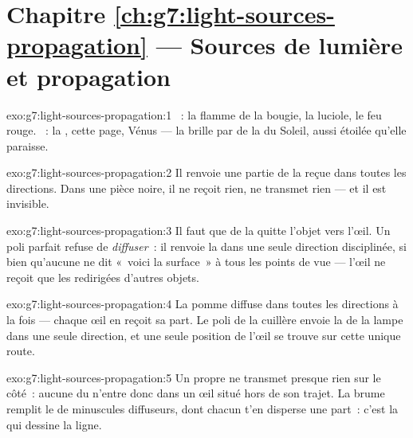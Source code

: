 \section*{Chapitre \ref{ch:g7:light-sources-propagation} --- Sources de lumière et propagation}

\begin{solution}{exo:g7:light-sources-propagation:1}
~: la flamme de la bougie, la luciole, le feu rouge.
~: la , cette page, Vénus --- la  brille
par  de la  du Soleil, aussi étoilée qu'elle
paraisse.
\end{solution}

\begin{solution}{exo:g7:light-sources-propagation:2}
Il renvoie une partie de la  reçue dans toutes les directions.
Dans une pièce noire, il ne reçoit rien, ne transmet rien --- et il
est invisible.
\end{solution}

\begin{solution}{exo:g7:light-sources-propagation:3}
Il faut que de la  quitte l'objet vers l'œil. Un poli parfait
refuse de \emph{diffuser}~: il renvoie la  dans une seule
direction disciplinée, si bien qu'aucune  ne dit «~voici la
surface~» à tous les points de vue --- l'œil ne reçoit que les 
redirigées d'autres objets.
\end{solution}

\begin{solution}{exo:g7:light-sources-propagation:4}
La pomme diffuse dans toutes les directions à la fois --- chaque œil
en reçoit sa part. Le poli de la cuillère envoie la  de la
lampe dans une seule direction, et une seule position de l'œil se
trouve sur cette unique route.
\end{solution}

\begin{solution}{exo:g7:light-sources-propagation:5}
Un  propre ne transmet presque rien sur le côté~: aucune 
du  n'entre donc dans un œil situé hors de son trajet. La
brume remplit le  de minuscules diffuseurs, dont chacun t'en
disperse une part~: c'est la  qui dessine la ligne.
\end{solution}

